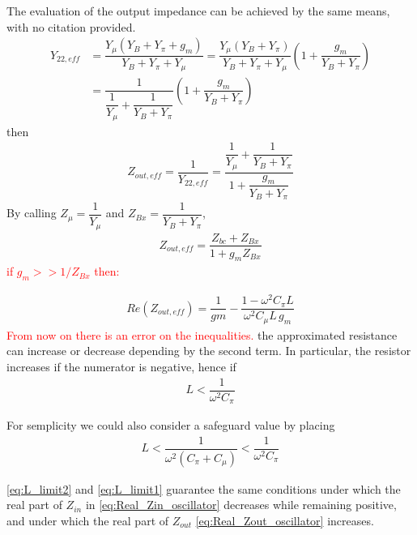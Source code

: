 The evaluation of the output impedance can be achieved by the same means, with no citation provided.
    \begin{align}
        Y_{22,eff} &=\dfrac{Y_{\mu}(Y_B+Y_{\pi}+g_m)}{Y_B+Y_{\pi}+Y_{\mu}}=\dfrac{Y_{\mu}(Y_B+Y_{\pi})}{Y_B+Y_{\pi}+Y_{\mu}}\left( 1+\dfrac{g_m}{Y_B+Y_{\pi}}\right)\\
        &=\dfrac{1}{\dfrac{1}{Y_\mu}+\dfrac{1}{Y_B+Y_\pi}}\left( 1+\dfrac{g_m}{Y_B+Y_{\pi}}\right)
    \end{align}
    then
\begin{align}
    Z_{out,eff}=\dfrac{1}{Y_{22,eff}}=\dfrac{\dfrac{1}{Y_\mu}+\dfrac{1}{Y_B+Y_\pi}}{1+\dfrac{g_m}{Y_B+Y_{\pi}}}
\end{align}
By calling $Z_\mu=\dfrac{1}{Y_\mu}$ and $Z_{Bx}=\dfrac{1}{Y_B+Y_\pi}$,
\begin{align}
    Z_{out,eff}=\dfrac{Z_{bc}+Z_{Bx}}{1+g_mZ_{Bx}}
\end{align}
\textcolor{red}{if $g_m>>1/Z_{Bx}$ then:}

\begin{align}
    Re(Z_{out,eff})=\dfrac{1}{gm}-\dfrac{1-\omega^2C_{\pi}L}{\omega^2C_{\mu}L\,g_m}
    \label{eq:Real_Zout_oscillator}
\end{align}
\textcolor{red}{From now on there is an error on the inequalities.}
the approximated resistance can increase or decrease depending by the second term. In particular, the resistor increases if the numerator is negative, hence if
\begin{align}
    L<\dfrac{1}{\omega^2C_{\pi}}
\end{align}

For semplicity we could also consider a safeguard value by placing 
\begin{align}
    L<\dfrac{1}{\omega^2(C_{\pi}+C_{\mu})}<\dfrac{1}{\omega^2C_{\pi}}
    \label{eq:L_limit2}
\end{align}

\eqref{eq:L_limit2} and \eqref{eq:L_limit1} guarantee the same conditions under which the real part of $Z_{in}$ in \eqref{eq:Real_Zin_oscillator} decreases while remaining positive, and under which the real part of $Z_{out}$ \eqref{eq:Real_Zout_oscillator} increases.


